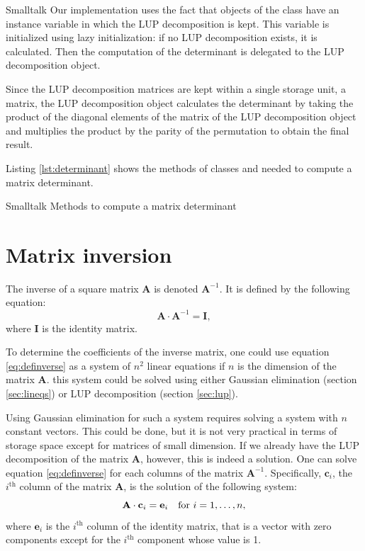 \begin{displaycode}{Smalltalk}
Our implementation uses the fact that objects of the class  have an instance variable in which the LUP decomposition
is kept. This variable is initialized using lazy initialization:
if no LUP decomposition exists, it is calculated. Then the
computation of the determinant is delegated to the LUP
decomposition object.

Since the LUP decomposition matrices are kept within a single
storage unit, a matrix, the LUP decomposition object calculates
the determinant by taking the product of the diagonal elements of
the matrix of the LUP decomposition object and multiplies the
product by the parity of the permutation to obtain the final
result.

Listing \ref{lst:determinant} shows the methods of classes  and  needed to compute a matrix determinant.

\begin{listing}[label=lst:determinant]{Smalltalk}
{Methods to compute a matrix determinant}
%
%
\end{listing}

\section{Matrix inversion}
\label{sec:matrixinversion} The inverse of a square matrix $\textbf{A}$ is denoted $\textbf{A}^{-1}$. It is defined by the following
equation:
\begin{equation}
\label{eq:definverse} \textbf{A}\cdot\textbf{A}^{-1}=\textbf{I},
\end{equation}
where $\textbf{I}$ is the identity matrix.

To determine the coefficients of the inverse matrix, one could use
equation \ref{eq:definverse} as a system of $n^2$ linear equations
if $n$ is the dimension of the matrix $\textbf{A}$. this system could
be solved using either Gaussian elimination (\cf section
\ref{sec:lineqs}) or LUP decomposition (\cf section
\ref{sec:lup}).

Using Gaussian elimination for such a system requires solving a
system with $n$ constant vectors. This could be done, but it is
not very practical in terms of storage space except for matrices
of small dimension. If we already have the LUP decomposition of
the matrix $\textbf{A}$, however, this is indeed a solution. One can
solve equation \ref{eq:definverse} for each columns of the matrix
$\textbf{A}^{-1}$. Specifically, $\textbf{c}_i$, the $i^{\mathop{th}}$
column of the matrix $\textbf{A}$, is the solution of the following
system:
\begin{equation}
  \textbf{A}\cdot\textbf{c}_i=\textbf{e}_i\mbox{\quad for $i=1,\ldots,n$},
\end{equation}
where $\textbf{e}_i$ is the $i^{\mathop{th}}$ column of the identity
matrix, that is a vector with zero components except for the
$i^{\mathop{th}}$ component whose value is 1.


\end{displaycode}

